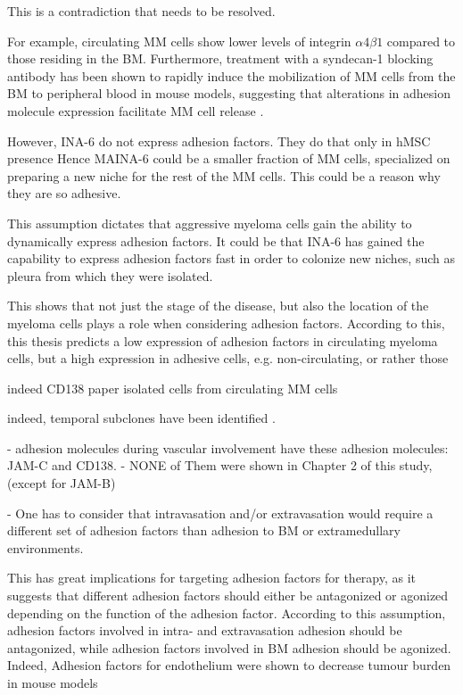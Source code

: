 This is a contradiction that needs to be resolved.

For example,
circulating MM cells show lower levels of integrin $\alpha4\beta1$
compared to those residing in the BM. Furthermore, treatment with a syndecan-1 blocking antibody
has been shown to rapidly induce the mobilization of MM cells from the BM to
peripheral blood in mouse models, suggesting that alterations in adhesion
molecule expression facilitate MM cell release
\cite{zeissigTumourDisseminationMultiple2020}.

However, INA-6 do not express adhesion factors. They do that only in hMSC presence
Hence MAINA-6 could be a smaller fraction of MM cells, specialized on preparing a new niche
for the rest of the MM cells. This could be a reason why they are so adhesive.

This assumption dictates that aggressive myeloma cells gain the ability
to dynamically express adhesion factors.
It could be that INA-6 has gained the capability to express adhesion factors
fast in order to colonize new niches, such as pleura from which they were
isolated.

This shows that not just the stage of the disease, but also the location of the
myeloma cells plays a role when considering adhesion factors. According to this, this thesis
predicts a low expression of adhesion factors in circulating myeloma cells,
but a high expression in adhesive cells, e.g. non-circulating, or rather those

indeed CD138 paper isolated cells from circulating MM cells \cite{akhmetzyanovaDynamicCD138Surface2020}

indeed, temporal subclones have been identified \cite{keatsClonalCompetitionAlternating2012}.

%
\label{sec:discussion_subsets_adhesion_factors}%

- adhesion molecules during vascular involvement have these adhesion molecules: JAM-C
and CD138.
- NONE of Them were shown in Chapter 2 of this study, (except for JAM-B)


- One has to consider that intravasation and/or extravasation would require a different
set of adhesion factors than adhesion to BM or extramedullary environments.

This has great implications for targeting adhesion factors for therapy, as it
suggests that different adhesion factors should either be antagonized or
agonized depending on the function of the adhesion factor. According to this
assumption, adhesion factors involved in intra- and extravasation adhesion should be
antagonized, while adhesion factors involved in BM adhesion  should be agonized. Indeed, Adhesion factors for endothelium
were shown to decrease tumour burden in mouse models \cite{asosinghUniquePathwayHoming2001a,mrozikTherapeuticTargetingNcadherin2015}

